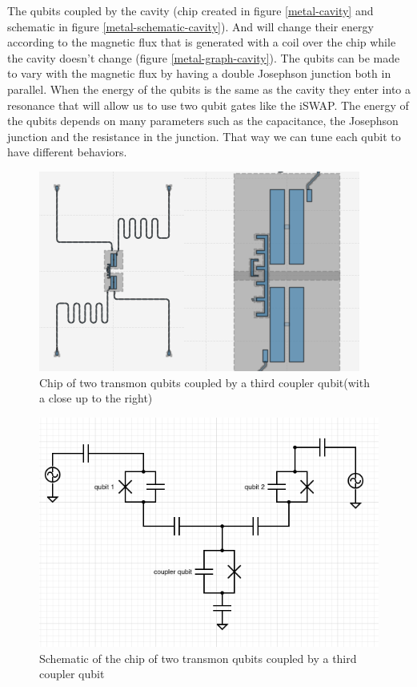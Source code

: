 \documentclass[12pt]{article}
\numberwithin{equation}{subsection}
\begin{document}
The qubits coupled by the cavity (chip created in figure \ref{metal-cavity} and schematic in figure \ref{metal-schematic-cavity}). And will  change their energy according to the magnetic flux that is generated with a coil over the chip while the cavity doesn't change (figure \ref{metal-graph-cavity}). The qubits can be made to vary with the magnetic flux by having a double Josephson junction both in parallel. When the energy of the qubits is the same as the cavity they enter into a resonance that will allow us to use two qubit gates like the iSWAP. The energy of the qubits depends on many parameters such as the capacitance, the Josephson junction and the resistance in the junction. That way we can tune each qubit to have different behaviors.

\begin{figure}[h]
\centering
\includegraphics[scale=0.6]{images/metal-coupler.png}
\caption{Chip of two transmon qubits coupled by a third coupler qubit(with a close up to the right)}
\label{metal-coupler}
\end{figure}


\begin{figure}[h]
\centering
\includegraphics[scale=0.6]{images/metal-schematic-coupler.png}
\caption{Schematic of the chip of two transmon qubits coupled by a third coupler qubit}
\label{metal-schematic-coupler}
\end{figure}
\end{document}
